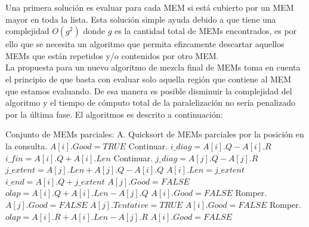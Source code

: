 \documentclass[12pt,a4paper]{article}
\begin{document}
\indent
Una primera solución es evaluar para cada MEM si está cubierto por un MEM mayor en toda la lista. Esta solución simple ayuda debido a que tiene una complejidad $O(g^2)$ donde $g$ es la cantidad total de MEMs encontrados, es por ello que se necesita un algoritmo que permita efizcamente descartar aquellos MEMs que están repetidos y/o contenidos por otro MEM.\\
\indent
La propuesta para un nuevo algoritmo de mezcla final de MEMs toma en cuenta el principio de que basta con evaluar solo aquella región que contiene al MEM que estamos evaluando. De esa manera es posible disminuir la complejidad del algoritmo y el tiempo de cómputo total de la paralelización no sería penalizado por la última fase. El algoritmos es descrito a continuación:
\begin{algorithmic}
  \STATE Conjunto de MEMs parciales: A.
  \STATE Quicksort de MEMs parciales por la posición en la consulta.
      \STATE $A[i].Good=TRUE$
  \ENDFOR
          \STATE Continuar.
      \ENDIF
      \STATE $i\_diag=A[i].Q-A[i].R$
      \STATE $i\_fin=A[i].Q+A[i].Len$
              \STATE Continuar.
          \ENDIF
          \STATE $j\_diag=A[j].Q-A[j].R$
              \STATE $j\_extent=A[j].Len+A[j].Q-A[i].Q$
                  \STATE $A[i].Len=j\_extent$
                  \STATE $i\_end=A[i].Q+j\_extent$
              \ENDIF
              \STATE $A[j].Good=FALSE$
              \STATE $olap=A[i].Q+A[i].Len-A[j].Q$
                      \STATE $A[i].Good=FALSE$
                      \STATE Romper.
                  \ENDIF
                      \STATE $A[j].Good=FALSE$
                  \ENDIF
              \ELSE
                      \STATE $A[j].Tentative=TRUE$
                          \STATE $A[i].Good=FALSE$
                          \STATE Romper.
                      \ENDIF
                  \ENDIF
              \ENDIF
              \STATE $olap=A[i].R+A[i].Len-A[j].R$
                      \STATE $A[i].Good=FALSE$

\end{algorithmic}
\end{document}
